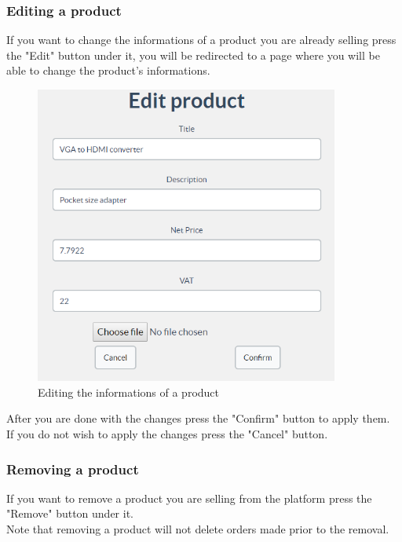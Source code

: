 		\subsubsection{Editing a product}
		If you want to change the informations of a product you are already 
		selling press the "Edit" button under it, you will be redirected to a 
		page where you will be able to change the product's informations.
		\begin{figure}[H]
			\includegraphics[width=10cm]{res/images/edit_product.png}
			\centering
			\caption{Editing the informations of a product}
		\end{figure}
		\noindent After you are done with the changes press the "Confirm" button to apply them.
		\\If you do not wish to apply the changes press the "Cancel" button.
		\subsubsection{Removing a product}
		If you want to remove a product you are selling from the platform press 
		the	"Remove" button under it.
		\\Note that removing a product will not delete orders made prior to the 
		removal. 
